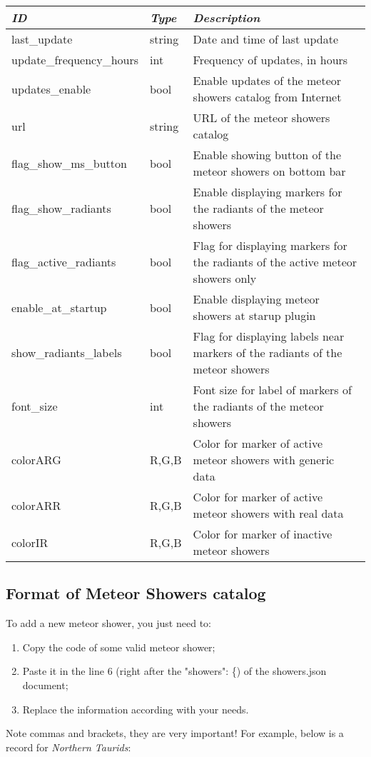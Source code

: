 \noindent%
\begin{tabularx}{\textwidth}{l|l|X}\toprule
\emph{ID}            & \emph{Type} & \emph{Description}\\\midrule
last\_update          & string & Date and time of last update \\\midrule
update\_frequency\_hours & int & Frequency of updates, in hours \\\midrule
updates\_enable         & bool & Enable updates of the meteor showers catalog from Internet \\\midrule
url                   & string & URL of the meteor showers catalog \\\midrule
flag\_show\_ms\_button  & bool & Enable showing button of the meteor showers on bottom bar \\\midrule
flag\_show\_radiants    & bool & Enable displaying markers for the radiants of the meteor showers \\\midrule
flag\_active\_radiants  & bool & Flag for displaying markers for the radiants of the active meteor showers only \\\midrule
enable\_at\_startup     & bool & Enable displaying meteor showers at starup plugin \\\midrule
show\_radiants\_labels  & bool & Flag for displaying labels near markers of the radiants of the meteor showers \\\midrule
font\_size              & int  & Font size for label of markers of the radiants of the meteor showers \\\midrule
colorARG               & R,G,B & Color for marker of active meteor showers with generic data \\\midrule
colorARR               & R,G,B & Color for marker of active meteor showers with real data \\\midrule
colorIR                & R,G,B & Color for marker of inactive meteor showers \\\bottomrule
\end{tabularx}

\newpage
\subsection{Format of Meteor Showers catalog}
\label{sec:plugins:MeteorShowers:format}

To add a new meteor shower, you just need to:
\begin{enumerate}
\item Copy the code of some valid meteor shower;
\item Paste it in the line 6 (right after the "showers": \{) of the showers.json document;
\item Replace the information according with your needs.
\end{enumerate}
Note commas and brackets, they are very important! For example, below is a record for \textit{Northern Taurids}:

